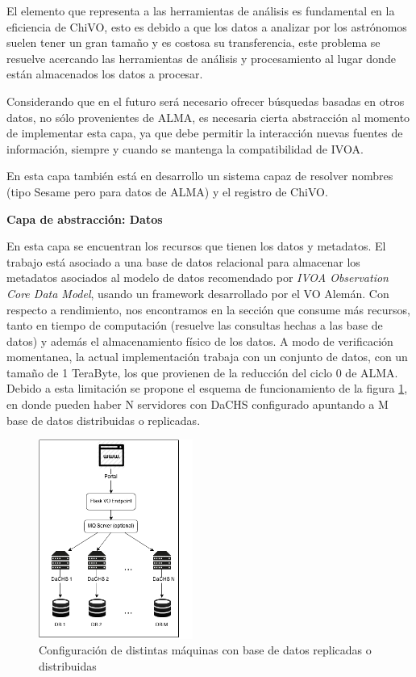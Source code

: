 El elemento que representa a las herramientas de análisis es fundamental en la
eficiencia de ChiVO, esto es debido a que los datos a analizar por los astrónomos
suelen tener un gran tamaño y es costosa su transferencia, este problema se
resuelve acercando las herramientas de análisis y procesamiento al lugar donde están
almacenados los datos a procesar.

Considerando que en el futuro será necesario ofrecer búsquedas
basadas en otros datos, no sólo provenientes de ALMA, es necesaria cierta
abstracción al momento de implementar esta capa, ya que debe permitir la interacción
nuevas fuentes de información, siempre y cuando se mantenga la compatibilidad
de IVOA.

En esta capa también está en desarrollo un sistema capaz de resolver nombres
(tipo Sesame pero para datos de ALMA) y el registro de ChiVO.

\textbf{Capa de abstracción: Datos}

En esta capa se encuentran los recursos que tienen los datos y metadatos.
El trabajo está asociado a una base de datos relacional para almacenar los
metadatos asociados al modelo de datos recomendado por \emph{IVOA Observation Core
Data Model}, usando un framework desarrollado por el VO Alemán.
Con respecto a rendimiento, nos encontramos en la sección que consume más
recursos, tanto en tiempo de computación (resuelve las consultas hechas a las base
de datos) y además el almacenamiento físico de los datos.
A modo de verificación momentanea,
la actual implementación trabaja con un conjunto de datos, con un tamaño
de 1 TeraByte, los que provienen de la reducción del ciclo 0 de ALMA.
Debido a esta limitación se propone
el esquema de funcionamiento de la figura \ref{fig:dachs}, en donde pueden haber N
servidores con DaCHS configurado apuntando a M base de datos distribuidas o replicadas.

\begin{figure}[ht]
    \centering
    \includegraphics[width=0.45\textwidth]{images/interaccion.png}
    \caption{Configuración de distintas máquinas con base de datos replicadas o distribuidas}
    \label{fig:dachs}
\end{figure}

